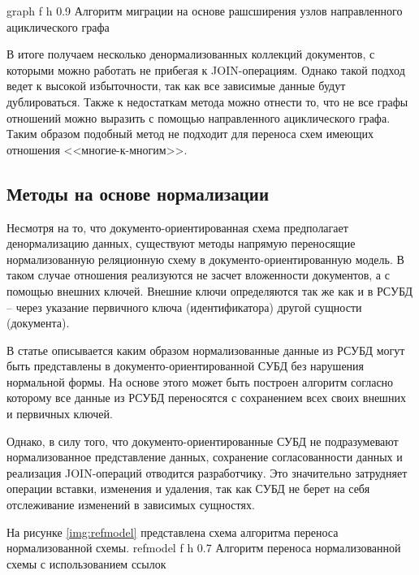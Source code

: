 \clearpage

    {graph} %
    {f} %
    {h} %
    {0.9\textwidth} %
    {Алгоритм миграции на основе рашсширения узлов направленного ациклического графа} %
    
В итоге получаем несколько денормализованных коллекций документов, с которыми можно работать не прибегая к JOIN-операциям.
Однако такой подход ведет к высокой избыточности, так как все зависимые данные будут дублироваться.
Также к недостаткам метода можно отнести то, что не все графы отношений можно выразить с помощью направленного ациклического графа.
Таким образом подобный метод не подходит для переноса схем имеющих отношения <<многие-к-многим>>. 

\clearpage
\subsection{Методы на основе нормализации}
Несмотря на то, что документо-ориентированная схема предполагает денормализацию данных,
существуют методы напрямую переносящие нормализованную реляционную схему в документо-ориентированную модель.
В таком случае отношения реализуются не засчет вложенности документов, а с помощью внешних ключей.
Внешние ключи определяются так же как и в РСУБД -- через указание первичного ключа (идентификатора) другой сущности (документа).

В статье \cite{reference} описывается каким образом нормализованные данные из РСУБД могут быть представлены в документо-ориентированной СУБД без нарушения нормальной формы.
На основе этого может быть построен алгоритм согласно которому все данные из РСУБД переносятся с сохранением всех своих внешних и первичных ключей.

Однако, в силу того, что документо-ориентированные СУБД не подразумевают нормализованное представление данных, сохранение согласованности данных и реализация JOIN-операций отводится разработчику.
Это значительно затрудняет операции вставки, изменения и удаления, так как СУБД не берет на себя отслеживание изменений в зависимых сущностях. 

\clearpage
На рисунке \ref{img:refmodel} представлена схема алгоритма переноса нормализованной схемы.
    {refmodel} %
    {f} %
    {h} %
    {0.7\textwidth} %
    {Алгоритм переноса нормализованной схемы с использованием ссылок} %

